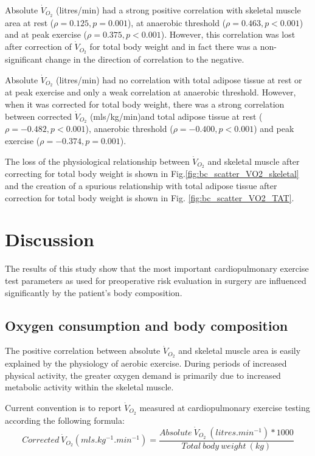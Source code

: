 Absolute $\dot{V}_{O_2}$ (litres/min) had a strong positive correlation with skeletal muscle area at rest ($\rho = 0.125, p = 0.001$), at anaerobic threshold ($\rho = 0.463, p<0.001$) and at peak exercise ($\rho = 0.375, p<0.001$). However, this correlation was lost after correction of $\dot{V}_{O_2}$ for total body weight and in fact there was a non-significant change in the direction of correlation to the negative.

Absolute $\dot{V}_{O_2}$ (litres/min) had no correlation with total adipose tissue at rest or at peak exercise and only a weak correlation at anaerobic threshold. However, when it was corrected for total body weight, there was a strong correlation between corrected $\dot{V}_{O_2}$ (mls/kg/min)and total adipose tissue at rest ($\rho = -0.482, p<0.001$), anaerobic threshold ($\rho = -0.400, p<0.001$) and peak exercise ($\rho = -0.374, p = 0.001$).

The loss of the physiological relationship between $\dot{V}_{O_2}$ and skeletal muscle after correcting for total body weight is shown in Fig.\ref{fig:bc_scatter_VO2_skeletal} and the creation of a spurious relationship with total adipose tissue after correction for total body weight is shown in Fig. \ref{fig:bc_scatter_VO2_TAT}.

\clearpage

\section{Discussion}

The results of this study show that the most important cardiopulmonary exercise test parameters as used for preoperative risk evaluation in surgery are influenced significantly by the patient's body composition. 

\subsection{Oxygen consumption and body composition}

The positive correlation between absolute $\dot{V}_{O_2}$ and skeletal muscle area is easily explained by the physiology of aerobic exercise. During periods of increased physical activity, the greater oxygen demand is primarily due to increased metabolic activity within the skeletal muscle. 

Current convention is to report $\dot{V}_{O_2}$ measured at cardiopulmonary exercise testing according the following formula: 
\[Corrected\ \dot{V}_{O_2} (mls.kg^{-1}.min^{-1}) = \frac{Absolute\ \dot{V}_{O_2}\ (litres.min^{-1}) * 1000}{Total\ body\ weight\ (kg)}\]

